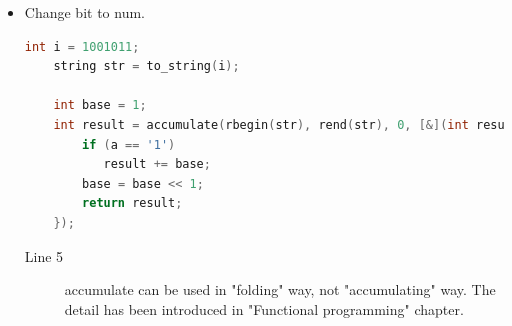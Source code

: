 \documentclass[a4paper,11pt,twoside]{book}
\begin{document}
\begin{itemize}
	\item Change bit to num.
\begin{lstlisting}[frame=single, language=c++]	
	int i = 1001011;
	string str = to_string(i);
	
	int base = 1;
	int result = accumulate(rbegin(str), rend(str), 0, [&](int result, char a) {
		if (a == '1')
		   result += base;
		base = base << 1;
		return result;
	});
\end{lstlisting}	
\begin{description}
	\item[Line 5] accumulate can be used in "folding" way, not "accumulating" way. The detail has been introduced in "Functional programming" chapter. 
\end{description}	
	
\end{itemize}
\end{document}
